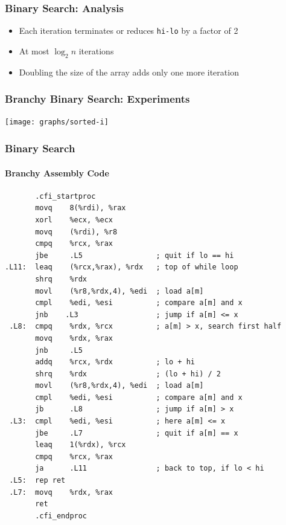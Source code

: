 \documentclass[xcolor=dvipsnames]{beamer}
\begin{document}
\begin{frame}[fragile]
  \frametitle{Binary Search: Analysis}

  \begin{itemize}[<+->]
    \item Each iteration terminates or 
      reduces \texttt{hi-lo} by a factor of 2
    \item At most $\log_2 n$ iterations
    \item Doubling the size of the array adds only one more iteration
  \end{itemize}
\end{frame}

\begin{frame}
  \frametitle{Branchy Binary Search: Experiments}
  \begin{center}
    \texttt{[image: graphs/sorted-i]}
  \end{center}
\end{frame}

\begin{frame}[fragile]
  \frametitle{Binary Search}
  \framesubtitle{Branchy Assembly Code}

\tiny
\begin{verbatim}
       .cfi_startproc
       movq    8(%rdi), %rax
       xorl    %ecx, %ecx
       movq    (%rdi), %r8
       cmpq    %rcx, %rax
       jbe     .L5                 ; quit if lo == hi
.L11:  leaq    (%rcx,%rax), %rdx   ; top of while loop
       shrq    %rdx
       movl    (%r8,%rdx,4), %edi  ; load a[m]
       cmpl    %edi, %esi          ; compare a[m] and x
       jnb    .L3                  ; jump if a[m] <= x
 .L8:  cmpq    %rdx, %rcx          ; a[m] > x, search first half
       movq    %rdx, %rax
       jnb     .L5
       addq    %rcx, %rdx          ; lo + hi
       shrq    %rdx                ; (lo + hi) / 2
       movl    (%r8,%rdx,4), %edi  ; load a[m]
       cmpl    %edi, %esi          ; compare a[m] and x
       jb      .L8                 ; jump if a[m] > x
 .L3:  cmpl    %edi, %esi          ; here a[m] <= x
       jbe     .L7                 ; quit if a[m] == x
       leaq    1(%rdx), %rcx
       cmpq    %rcx, %rax
       ja      .L11                ; back to top, if lo < hi
 .L5:  rep ret
 .L7:  movq    %rdx, %rax
       ret
       .cfi_endproc
\end{verbatim}

\end{frame}
\end{document}
